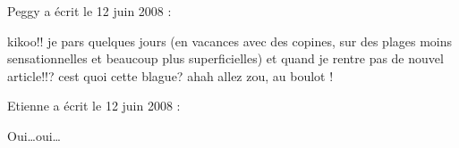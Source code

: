 \medskip
Peggy a écrit le 12 juin 2008 :
\begin{displayquote}
kikoo!! je pars quelques jours (en vacances avec des copines, sur des plages moins sensationnelles et beaucoup plus superficielles) et quand je rentre pas de nouvel article!!?
cest quoi cette blague? ahah
allez zou, au boulot !
\end{displayquote}

\medskip
Etienne a écrit le 12 juin 2008 :
\begin{displayquote}
Oui\dots oui\dots
\end{displayquote}

\vfill
